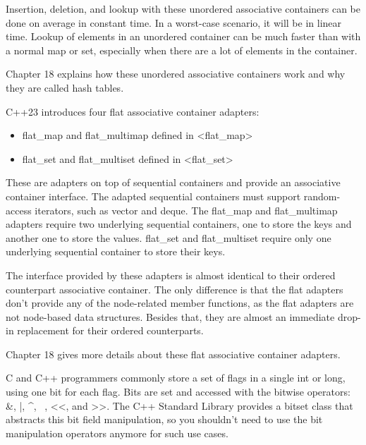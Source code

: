 Insertion, deletion, and lookup with these unordered associative containers can be done on average in constant time. In a worst-case scenario, it will be in linear time. Lookup of elements in an unordered container can be much faster than with a normal map or set, especially when there are a lot of elements in the container.

Chapter 18 explains how these unordered associative containers work and why they are called hash tables.



C++23 introduces four flat associative container adapters:

\begin{itemize}
\item
flat\_map and flat\_multimap defined in <flat\_map>

\item
flat\_set and flat\_multiset defined in <flat\_set>
\end{itemize}

These are adapters on top of sequential containers and provide an associative container interface. The adapted sequential containers must support random-access iterators, such as vector and deque. The flat\_map and flat\_multimap adapters require two underlying sequential containers, one to store the keys and another one to store the values. flat\_set and flat\_multiset require only one underlying sequential container to store their keys.

The interface provided by these adapters is almost identical to their ordered counterpart associative container. The only difference is that the flat adapters don’t provide any of the node-related member functions, as the flat adapters are not node-based data structures. Besides that, they are almost an immediate drop-in replacement for their ordered counterparts.

Chapter 18 gives more details about these flat associative container adapters.


C and C++ programmers commonly store a set of flags in a single int or long, using one bit for each flag. Bits are set and accessed with the bitwise operators: \&, |, \^{}, ~, <{}<, and >{}>. The C++ Standard Library provides a bitset class that abstracts this bit field manipulation, so you shouldn’t need to use the bit manipulation operators anymore for such use cases.

